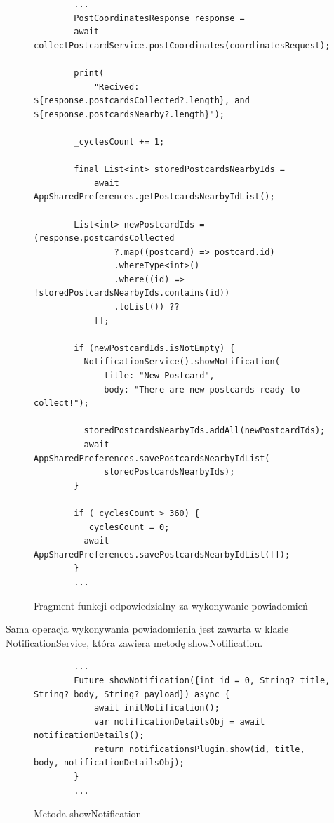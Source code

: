\documentclass[a4paper,twoside,12pt]{book}
\begin{document}
\begin{figure}[H]
        \begin{lstlisting}
        ...
        PostCoordinatesResponse response =
        await collectPostcardService.postCoordinates(coordinatesRequest);

        print(
            "Recived: ${response.postcardsCollected?.length}, and ${response.postcardsNearby?.length}");
    
        _cyclesCount += 1;
    
        final List<int> storedPostcardsNearbyIds =
            await AppSharedPreferences.getPostcardsNearbyIdList();
    
        List<int> newPostcardIds = (response.postcardsCollected
                ?.map((postcard) => postcard.id)
                .whereType<int>()
                .where((id) => !storedPostcardsNearbyIds.contains(id))
                .toList()) ??
            [];
    
        if (newPostcardIds.isNotEmpty) {
          NotificationService().showNotification(
              title: "New Postcard",
              body: "There are new postcards ready to collect!");
    
          storedPostcardsNearbyIds.addAll(newPostcardIds);
          await AppSharedPreferences.savePostcardsNearbyIdList(
              storedPostcardsNearbyIds);
        }
    
        if (_cyclesCount > 360) {
          _cyclesCount = 0;
          await AppSharedPreferences.savePostcardsNearbyIdList([]);
        }
        ...
        \end{lstlisting}
    \caption{Fragment funkcji odpowiedzialny za wykonywanie powiadomień}
    \label{fig:pseudokod:listings}
    \end{figure}
    \newpage
Sama operacja wykonywania powiadomienia jest zawarta w klasie NotificationService, która zawiera metodę showNotification.
\begin{figure}[H]
        \begin{lstlisting}
        ...
        Future showNotification({int id = 0, String? title, String? body, String? payload}) async {
            await initNotification();
            var notificationDetailsObj = await notificationDetails();
            return notificationsPlugin.show(id, title, body, notificationDetailsObj);
        }
        ...
        \end{lstlisting}
    \caption{Metoda showNotification}
    \label{fig:pseudokod:listings}
    \end{figure}
\end{document}
